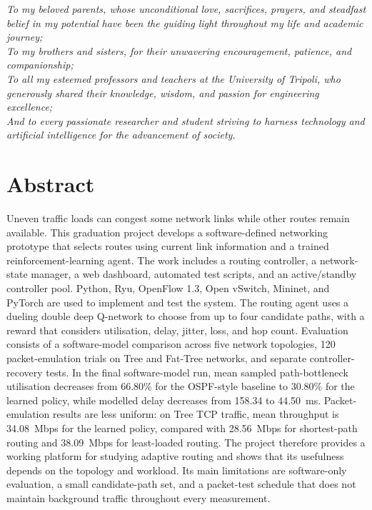 \documentclass[12pt,a4paper,oneside]{report}
\begin{document}
\vspace*{2.0cm}
\begin{center}
    \textit{To my beloved parents, whose unconditional love, sacrifices, prayers, and steadfast belief in my potential have been the guiding light throughout my life and academic journey;}\\[1.5cm]
    \textit{To my brothers and sisters, for their unwavering encouragement, patience, and companionship;}\\[1.5cm]
    \textit{To all my esteemed professors and teachers at the University of Tripoli, who generously shared their knowledge, wisdom, and passion for engineering excellence;}\\[1.5cm]
    \textit{And to every passionate researcher and student striving to harness technology and artificial intelligence for the advancement of society.}
\end{center}

\clearpage

\clearpage
{}
\setcounter{page}{1}
\hypersetup{pageanchor=true}
\chapter*{Abstract}

Uneven traffic loads can congest some network links while other routes remain available. This graduation project develops a software-defined networking prototype that selects routes using current link information and a trained reinforcement-learning agent. The work includes a routing controller, a network-state manager, a web dashboard, automated test scripts, and an active/standby controller pool. Python, Ryu, OpenFlow 1.3, Open vSwitch, Mininet, and PyTorch are used to implement and test the system. The routing agent uses a dueling double deep Q-network to choose from up to four candidate paths, with a reward that considers utilisation, delay, jitter, loss, and hop count. Evaluation consists of a software-model comparison across five network topologies, 120 packet-emulation trials on Tree and Fat-Tree networks, and separate controller-recovery tests. In the final software-model run, mean sampled path-bottleneck utilisation decreases from 66.80\% for the OSPF-style baseline to 30.80\% for the learned policy, while modelled delay decreases from 158.34 to 44.50~ms. Packet-emulation results are less uniform: on Tree TCP traffic, mean throughput is 34.08~Mbps for the learned policy, compared with 28.56~Mbps for shortest-path routing and 38.09~Mbps for least-loaded routing. The project therefore provides a working platform for studying adaptive routing and shows that its usefulness depends on the topology and workload. Its main limitations are software-only evaluation, a small candidate-path set, and a packet-test schedule that does not maintain background traffic throughout every measurement.
\end{document}
